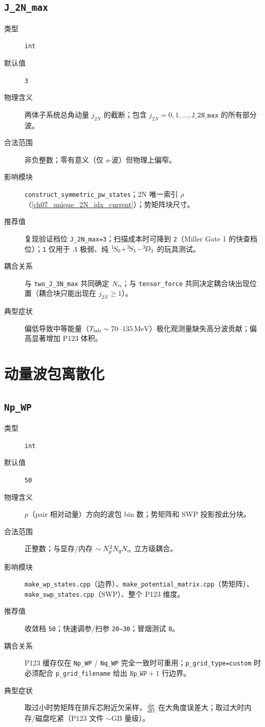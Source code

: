 \subsection{\texttt{J\_2N\_max}}

\begin{description}
  \item[类型] \texttt{int}
  \item[默认值] \texttt{3}
  \item[物理含义] 两体子系统总角动量 \(j_{2N}\) 的截断；包含 \(j_{2N}=0,1,\dots,\texttt{J\_2N\_max}\) 的所有部分波。
  \item[合法范围] 非负整数；零有意义（仅 \(s\)-波）但物理上偏窄。
  \item[影响模块] \texttt{construct\_symmetric\_pw\_states}；2N 唯一索引 \(\rho\)（\cref{ch07_unique_2N_idx_current}）；势矩阵块尺寸。
  \item[推荐值] 复现验证档位 \texttt{J\_2N\_max=3}；扫描成本时可降到 \texttt{2}（Miller Gate 1 的快查档位）；\texttt{1} 仅用于 \(\Lambda\) 极弱、纯 \({}^{1}\!S_{0}\!+\!{}^{3}\!S_{1}\!-\!{}^{3}\!D_{1}\) 的玩具测试。
  \item[耦合关系] 与 \texttt{two\_J\_3N\_max} 共同确定 \(N_\alpha\)；与 \texttt{tensor\_force} 共同决定耦合块出现位置（耦合块只能出现在 \(j_{2N}\ge 1\)）。
  \item[典型症状] 偏低导致中等能量（\({T_{\text{lab}}}\sim 70\)–\(135\,\mathrm{MeV}\)）极化观测量缺失高分波贡献；偏高显著增加 P123 体积。
\end{description}

\section{动量波包离散化}
\label{sec:appE_wp_grid}

\subsection{\texttt{Np\_WP}}

\begin{description}
  \item[类型] \texttt{int}
  \item[默认值] \texttt{50}
  \item[物理含义] \(p\)（pair 相对动量）方向的波包 bin 数；势矩阵和 SWP 投影按此分块。
  \item[合法范围] 正整数；与显存/内存 \(\sim N_{p}^{2} N_{q} N_\alpha\) 立方级耦合。
  \item[影响模块] \texttt{make\_wp\_states.cpp}（边界）、\texttt{make\_potential\_matrix.cpp}（势矩阵）、\texttt{make\_swp\_states.cpp}（SWP）、整个 P123 维度。
  \item[推荐值] 收敛档 \texttt{50}；快速调参/扫参 \texttt{20–30}；冒烟测试 \texttt{8}。
  \item[耦合关系] P123 缓存仅在 \texttt{Np\_WP} / \texttt{Nq\_WP} 完全一致时可重用；\texttt{p\_grid\_type=custom} 时必须配合 \texttt{p\_grid\_filename} 给出 \(\texttt{Np\_WP}+1\) 行边界。
  \item[典型症状] 取过小时势矩阵在排斥芯附近欠采样，\(\frac{d\sigma}{d\Omega}\) 在大角度误差大；取过大时内存/磁盘吃紧（P123 文件 \(\sim\)GB 量级）。
\end{description}


